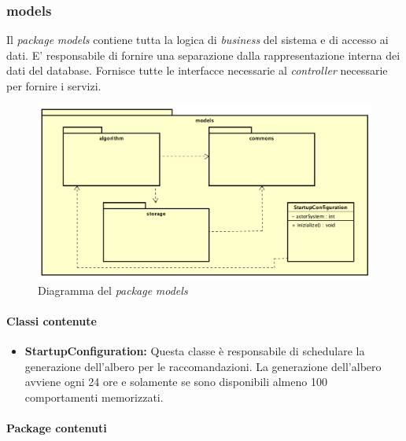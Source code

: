 \subsubsection{models}
Il \emph{package} \emph{models} contiene tutta la logica di \emph{business} del sistema e di accesso ai dati. E' responsabile di fornire una separazione dalla rappresentazione interna dei dati del database. Fornisce tutte le interfacce necessarie al \emph{controller} necessarie per fornire i servizi.
\begin{figure}[h]
\centering
\includegraphics[scale=0.30]{immagini/models}
\caption{Diagramma del \emph{package} \emph{models}}
\label{fig:pack-models}
\end{figure}
\paragraph{Classi contenute}
\begin{itemize}
\item \textbf{StartupConfiguration:} Questa classe è responsabile di schedulare la generazione dell'albero per le raccomandazioni. La generazione dell'albero avviene ogni 24 ore e solamente se sono disponibili almeno 100 comportamenti memorizzati.
\end{itemize}
\paragraph{Package contenuti}
